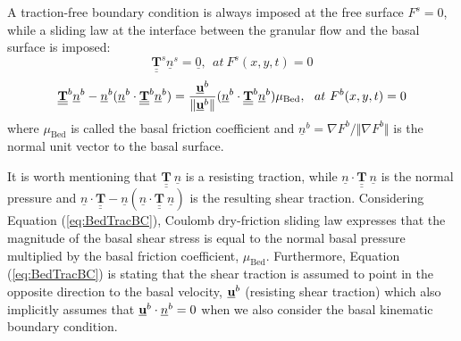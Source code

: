 A traction-free boundary condition is always imposed at the free surface $F^s=0$, while a sliding law at the interface between the granular flow and the basal surface is imposed:
\begin{equation}\label{eq:SurTracBC}
\underline{\underline{{\mathbf{T}}}}^s\underline{n}^s=\underline{0}, \ \ at \ F^s(x,y,t)=0
\end{equation}
\begin{equation}\label{eq:BedTracBC}
\underline{\underline{{\mathbf{T}}}}^b\underline{n}^b-\underline{n}^b(\underline{n}^b\cdot \underline{\underline{{\mathbf{T}}}}^b\underline{n}^b)=\frac{\underline{{\textbf u}}^b}{\Vert\underline{{\textbf u}}^b\Vert}(\underline{n}^b\cdot \underline{\underline{{\mathbf{T}}}}^b\underline{n}^b)\mu_{\mathrm{Bed}}, \ \ at \ F^b(x,y,t)=0
\end{equation}
where $\mu_{\mathrm{Bed}}$ is called the basal friction coefficient and  $\underline{n}^b=\nabla F^b/\Vert\nabla F^b\Vert$ is the normal unit vector to the basal surface.


It is worth mentioning that $\underline{\underline{{\mathbf{T}}}} \ \underline{n}$ is a resisting traction, while $\underline{n}\cdot\underline{\underline{{\mathbf{T}}}} \ \underline{n}$ is the normal pressure and $\underline{n}\cdot\underline{\underline{{\mathbf{T}}}}-\underline{n}(\underline{n}\cdot\underline{\underline{{\mathbf{T}}}} \ \underline{n})$ is the resulting shear traction. Considering Equation (\ref{eq:BedTracBC}), Coulomb dry-friction sliding law expresses that the magnitude of the basal shear stress is equal to the normal basal pressure multiplied by the basal friction coefficient, $\mu_{\mathrm{Bed}}$. Furthermore, Equation (\ref{eq:BedTracBC}) is stating that the shear traction is assumed to point in the opposite direction to the basal velocity, $\underline{{\textbf u}}^b$ (resisting shear traction) which also implicitly assumes that $\underline{{\textbf u}}^b\cdot \underline{n}^b=0$ when we also consider the basal kinematic boundary condition.














